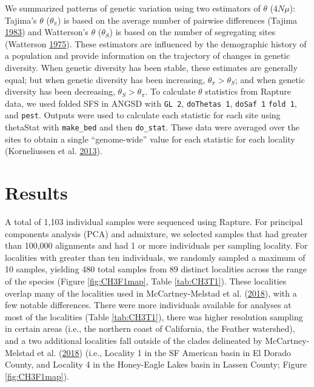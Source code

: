 \documentclass[proquest,12pt,final]{ucthesis-CA2012} %
\begin{document}
\begin{ucmainmatter}
We summarized patterns of genetic variation using two estimators of
\(\theta\) (\(4N\mu\)): Tajima's \(\theta\) (\(\theta_\pi\)) is based on
the average number of pairwise differences (Tajima
\protect\hyperlink{ref-tajima_evolutionary_1983}{1983}) and Watterson's
\(\theta\) (\(\theta_S\)) is based on the number of segregating sites
(Watterson \protect\hyperlink{ref-watterson_number_1975}{1975}). These
estimators are influenced by the demographic history of a population and
provide information on the trajectory of changes in genetic diversity.
When genetic diversity has been stable, these estimates are generally
equal; but when genetic diversity has been increasing,
\(\theta_\pi > \theta_S\); and when genetic diversity has been
decreasing, \(\theta_S > \theta_\pi\). To calculate \(\theta\)
statistics from Rapture data, we used folded SFS in ANGSD with
\texttt{GL\ 2}, \texttt{doThetas\ 1}, \texttt{doSaf\ 1}
\texttt{fold\ 1}, and \texttt{pest}. Outputs were used to calculate each
statistic for each site using thetaStat with \texttt{make\_bed} and then
\texttt{do\_stat}. These data were averaged over the sites to obtain a
single ``genome-wide'' value for each statistic for each locality
(Korneliussen et al.
\protect\hyperlink{ref-korneliussen_calculation_2013}{2013}).

\hypertarget{results-2}{%
\section{Results}\label{results-2}}

A total of 1,103 individual samples were sequenced using Rapture. For
principal components analysis (PCA) and admixture, we selected samples
that had greater than 100,000 alignments and had 1 or more individuals
per sampling locality. For localities with greater than ten individuals,
we randomly sampled a maximum of 10 samples, yielding 480 total samples
from 89 distinct localities across the range of the species (Figure
\ref{fig:CH3F1map}, Table \ref{tab:CH3T1}). These localities overlap
many of the localities used in McCartney-Melstad et al.
(\protect\hyperlink{ref-mccartney-melstad_population_2018}{2018}), with
a few notable differences. There were more individuals available for
analyses at most of the localities (Table \ref{tab:CH3T1}), there was
higher resolution sampling in certain areas (i.e., the northern coast of
California, the Feather watershed), and a two additional localities fall
outside of the clades delineated by McCartney-Melstad et al.
(\protect\hyperlink{ref-mccartney-melstad_population_2018}{2018}) (i.e.,
Locality 1 in the SF American basin in El Dorado County, and Locality 4
in the Honey-Eagle Lakes basin in Lassen County; Figure
\ref{fig:CH3F1map}).











\end{ucmainmatter}
\end{document}
